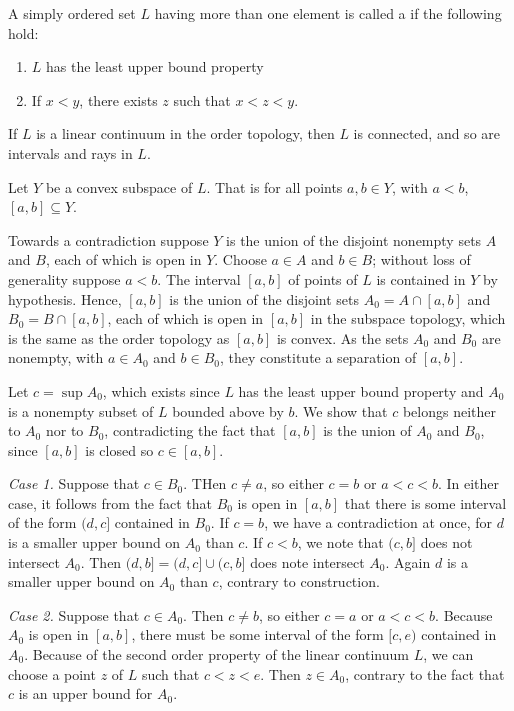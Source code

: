 \documentclass[12pt, a4paper, twoside, openright, titlepage]{book}
\begin{document}
\begin{defn}{}{}
    A simply ordered set $L$ having more than one element is called a  if the following hold: \begin{enumerate}
        \item $L$ has the least upper bound property
        \item If $x < y$, there exists $z$ such that $x < z < y$.
    \end{enumerate}
\end{defn}

\begin{thm}{}{}
    If $L$ is a linear continuum in the order topology, then $L$ is connected, and so are intervals and rays in $L$.
\end{thm}
\begin{proof*}{}{}
    Let $Y$ be a convex subspace of $L$. That is for all points $a,b \in Y$, with $a<b$, $[a,b] \subseteq Y$.

    Towards a contradiction suppose $Y$ is the union of the disjoint nonempty sets $A$ and $B$, each of which is open in $Y$. Choose $a \in A$ and $b \in B$; without loss of generality suppose $a < b$. The interval $[a,b]$ of points of $L$ is contained in $Y$ by hypothesis. Hence, $[a,b]$ is the union of the disjoint sets $A_0 = A\cap [a,b]$ and $B_0 = B\cap[a,b]$, each of which is open in $[a,b]$ in the subspace topology, which is the same as the order topology as $[a,b]$ is convex. As the sets $A_0$ and $B_0$ are nonempty, with $a \in A_0$ and $b \in B_0$, they constitute a separation of $[a,b]$.

    Let $c = \sup A_0$, which exists since $L$ has the least upper bound property and $A_0$ is a nonempty subset of $L$ bounded above by $b$. We show that $c$ belongs neither to $A_0$ nor to $B_0$, contradicting the fact that $[a,b]$ is the union of $A_0$ and $B_0$, since $[a,b]$ is closed so $c\in[a,b]$.


    \emph{Case 1.} Suppose that $c \in B_0$. THen $c \neq a$, so either $c = b$ or $a < c < b$. In either case, it follows from the fact that $B_0$ is open in $[a,b]$ that there is some interval of the form $(d,c]$ contained in $B_0$. If $c = b$, we have a contradiction at once, for $d$ is a smaller upper bound on $A_0$ than $c$. If $c < b$, we note that $(c,b]$ does not intersect $A_0$. Then $(d,b] = (d,c] \cup (c,b]$ does note intersect $A_0$. Again $d$ is a smaller upper bound on $A_0$ than $c$, contrary to construction.


    \emph{Case 2.} Suppose that $c \in A_0$. Then $c \neq b$, so either $c = a$ or $a < c < b$. Because $A_0$ is open in $[a,b]$, there must be some interval of the form $[c,e)$ contained in $A_0$. Because of the second order property of the linear continuum $L$, we can choose a point $z$ of $L$ such that $c < z < e$. Then $z \in A_0$, contrary to the fact that $c$ is an upper bound for $A_0$.
\end{proof*}
\end{document}
